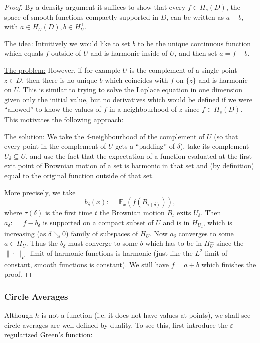 \documentclass[11pt,reqno]{amsart}
\numberwithin{equation}{section}
\newcommand{\deq}{\mathrel{\mathop:}=}
\newcommand{\eps}{\varepsilon}
\begin{document}
\begin{proof}
	By a density argument it suffices to show that every $f\in H_s(D)$, the space of smooth functions compactly supported in $D$, can be written as $a+b$, with $a\in H_U(D), b\in H_U^\perp$.
	
	\underline{The idea:} Intuitively we would like to set $b$ to be the unique continuous function which equals $f$ outside of $U$ and is harmonic inside of $U$, and then set $a=f-b$. 
	
	\underline{The problem:} However, if for example $U$ is the complement of a single point $z\in D$, then there is no unique $b$ which coincides with $f$ on $\{z\}$ and is harmonic on $U$. This is similar to trying to solve the Laplace equation in one dimension given only the initial value, but no derivatives which would be defined if we were ``allowed'' to know the values of $f$ in a neighbourhood of $z$ since $f\in H_s(D)$. This motivates the following approach:
	
	\underline{The solution:} We take the $\delta$-neighbourhood of the complement of $U$ (so that every point in the complement of $U$ gets a ``padding'' of $\delta$), take its complement $U_\delta\subseteq U$, and use the fact that the expectation of a function evaluated at the first exit point of Brownian motion of a set is harmonic in that set and (by definition) equal to the original function outside of that set.
	
	More precisely, we take $$b_\delta(x)\deq \mathbb E_x(f(B_{\tau(\delta)})),$$ where $\tau(\delta)$ is the first time $t$ the Brownian motion $B_t$ exits $U_\delta$. Then $a_\delta\deq f-b_\delta$ is supported on a compact subset of $U$ and is in $H_{U_\delta}$, which is increasing (as $\delta\searrow 0$) family of subspaces of $H_U$. Now $a_\delta$ converges to some $a\in H_U$. Thus the $b_\delta$ must converge to some $b$ which has to be in $H_U^\perp$ since the $\|\cdot\|_\nabla$ limit of harmonic functions is harmonic (just like the $L^2$ limit of constant, smooth functions is constant). 
	We still have $f=a+b$ which finishes the proof.
\end{proof}

\subsubsection{Circle Averages}

Although $h$ is not a function (i.e. it does not have values at points), we shall see circle averages are well-defined by duality. To see this, first introduce the $\eps$-regularized Green's function:
\end{document}
